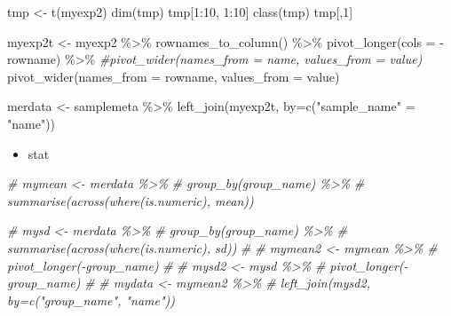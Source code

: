 \documentclass[
]{book}
\newenvironment{Shaded}{\begin{snugshade}}{\end{snugshade}}
\newcommand{\AttributeTok}[1]{\textcolor[rgb]{0.77,0.63,0.00}{#1}}
\newcommand{\CommentTok}[1]{\textcolor[rgb]{0.56,0.35,0.01}{\textit{#1}}}
\newcommand{\DecValTok}[1]{\textcolor[rgb]{0.00,0.00,0.81}{#1}}
\newcommand{\FunctionTok}[1]{\textcolor[rgb]{0.00,0.00,0.00}{#1}}
\newcommand{\NormalTok}[1]{#1}
\newcommand{\OtherTok}[1]{\textcolor[rgb]{0.56,0.35,0.01}{#1}}
\newcommand{\SpecialCharTok}[1]{\textcolor[rgb]{0.00,0.00,0.00}{#1}}
\newcommand{\StringTok}[1]{\textcolor[rgb]{0.31,0.60,0.02}{#1}}
\providecommand{\tightlist}{%
  \setlength{\itemsep}{0pt}\setlength{\parskip}{0pt}}
\begin{document}
\begin{Shaded}
\begin{Highlighting}[]

\NormalTok{tmp }\OtherTok{\textless{}{-}} \FunctionTok{t}\NormalTok{(myexp2)}
\FunctionTok{dim}\NormalTok{(tmp)}
\NormalTok{tmp[}\DecValTok{1}\SpecialCharTok{:}\DecValTok{10}\NormalTok{, }\DecValTok{1}\SpecialCharTok{:}\DecValTok{10}\NormalTok{]}
\FunctionTok{class}\NormalTok{(tmp)}
\NormalTok{tmp[,}\DecValTok{1}\NormalTok{]}


\NormalTok{myexp2t }\OtherTok{\textless{}{-}}\NormalTok{ myexp2 }\SpecialCharTok{\%\textgreater{}\%} 
  \FunctionTok{rownames\_to\_column}\NormalTok{() }\SpecialCharTok{\%\textgreater{}\%} 
  \FunctionTok{pivot\_longer}\NormalTok{(}\AttributeTok{cols =} \SpecialCharTok{{-}}\NormalTok{rowname) }\SpecialCharTok{\%\textgreater{}\%} 
  \CommentTok{\#pivot\_wider(names\_from = name, values\_from = value)}
  \FunctionTok{pivot\_wider}\NormalTok{(}\AttributeTok{names\_from =}\NormalTok{ rowname, }\AttributeTok{values\_from =}\NormalTok{ value)}


\NormalTok{merdata }\OtherTok{\textless{}{-}}\NormalTok{ samplemeta }\SpecialCharTok{\%\textgreater{}\%} 
  \FunctionTok{left\_join}\NormalTok{(myexp2t, }\AttributeTok{by=}\FunctionTok{c}\NormalTok{(}\StringTok{"sample\_name"} \OtherTok{=} \StringTok{"name"}\NormalTok{))}
\end{Highlighting}
\end{Shaded}

\begin{itemize}
\tightlist
\item
  stat
\end{itemize}

\begin{Shaded}
\begin{Highlighting}[]
\CommentTok{\# mymean \textless{}{-} merdata \%\textgreater{}\% }
\CommentTok{\#   group\_by(group\_name) \%\textgreater{}\% }
\CommentTok{\#   summarise(across(where(is.numeric), mean))}

\CommentTok{\# mysd \textless{}{-} merdata \%\textgreater{}\% }
\CommentTok{\#   group\_by(group\_name) \%\textgreater{}\% }
\CommentTok{\#   summarise(across(where(is.numeric), sd))}
\CommentTok{\# }
\CommentTok{\# mymean2 \textless{}{-} mymean \%\textgreater{}\% }
\CommentTok{\#   pivot\_longer({-}group\_name) }
\CommentTok{\# }
\CommentTok{\# mysd2 \textless{}{-} mysd \%\textgreater{}\% }
\CommentTok{\#   pivot\_longer({-}group\_name) }
\CommentTok{\# }
\CommentTok{\# mydata \textless{}{-} mymean2 \%\textgreater{}\% }
\CommentTok{\#   left\_join(mysd2, by=c("group\_name", "name"))}
\end{Highlighting}
\end{Shaded}
\end{document}
